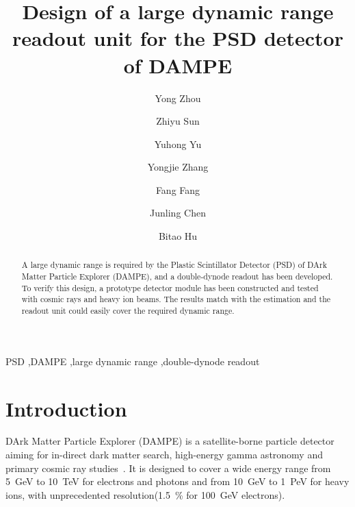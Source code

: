 \documentclass[preprint, times]{elsarticle}
\begin{document}
\begin{frontmatter}

\title{Design of a large dynamic range readout unit for the PSD detector of DAMPE}

\author[imp,lzu,ucas]{Yong Zhou}
\author[imp]{Zhiyu Sun}

\author[imp]{Yuhong Yu}

\author[imp]{Yongjie Zhang}
\author[imp]{Fang Fang}
\author[imp]{Junling Chen}

\author[lzu]{Bitao Hu}

\address[imp]{Institute of Modern Physics, Chinese Academy of Sciences,  509 Nanchang Road,  Lanzhou,  730000,  P.R.China}
\address[lzu]{School of Nuclear Science and Technology,  Lanzhou University,  222 South Tianshui Road,  Lanzhou,  730000,  P.R.China}
\address[ucas]{Graduate University of the Chinese Academy of Sciences,  19A Yuquan Road,  Beijing,  100049,  P.R.China}
\begin{abstract}

A large dynamic range is required by the Plastic Scintillator Detector (PSD) of DArk Matter Particle Explorer (DAMPE), and a double-dynode readout has been developed. To verify this design, a prototype detector module has been constructed and tested with cosmic rays and heavy ion beams.
The results match with the estimation and the readout unit could easily cover the required dynamic range.

\end{abstract}

\begin{keyword}
PSD
\sep DAMPE
\sep large dynamic range
\sep double-dynode readout


\end{keyword}

\end{frontmatter}

\linenumbers
\section{Introduction}
\label{sec:introduction}

DArk Matter Particle Explorer (DAMPE) is a satellite-borne particle
detector aiming for in-direct dark matter search, high-energy gamma
astronomy and primary cosmic ray studies~\cite{Chang_Jin_dampe}. It is
designed to cover a wide energy range from \SI{5}{GeV} to
\SI{10}{TeV} for electrons and photons and from \SI{10}{GeV} to
\SI{1}{PeV} for heavy ions, with unprecedented
resolution(\SI{1.5}{\percent} for \SI{100}{\giga\electronvolt} electrons).
\end{document}
